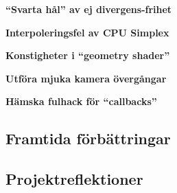 \documentclass[a4paper]{article}
\begin{document}
\begin{multicols}{2}
            \textbf{``Svarta hål'' av ej divergens-frihet}


            \textbf{Interpoleringsfel av CPU Simplex}


            \textbf{Konstigheter i ``geometry shader''}


            \textbf{Utföra mjuka kamera övergångar}


            \textbf{Hämska fulhack för ``callbacks'' }


        \subsection{Framtida förbättringar}

        \subsection{Projektreflektioner}

    \nocite{*} %
    
    
\end{multicols}
\end{document}
